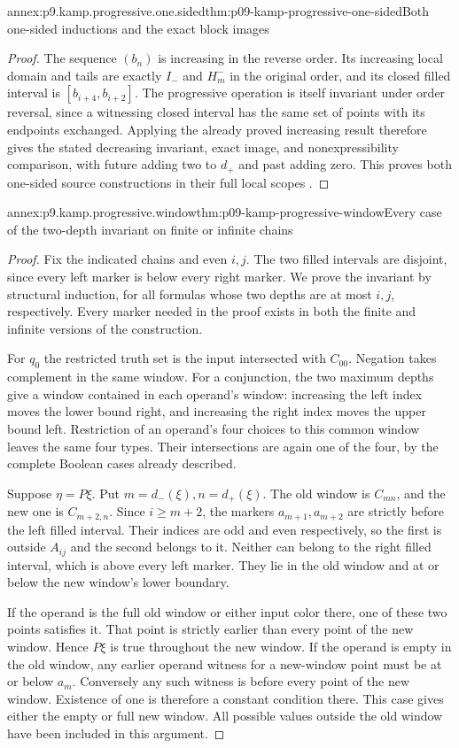 \begin{annexitem}{annex:p9.kamp.progressive.one.sided}{thm:p09-kamp-progressive-one-sided}{Both one-sided inductions and the exact block images}
\begin{proof}
The sequence \((b_n)\) is increasing
in the reverse order. Its increasing
local domain and tails are exactly
\(I_-\) and \(H_m^-\) in the original
order, and its closed filled interval is
\([b_{i+4},b_{i+2}]\). The progressive
operation is itself invariant under order
reversal, since a witnessing closed interval
has the same set of points with its
endpoints exchanged. Applying the already
proved increasing result therefore gives
the stated decreasing invariant, exact
image, and nonexpressibility comparison,
with future adding two to \(d_+\) and
past adding zero. This proves both one-sided
source constructions in their full local
scopes
\cite[pp.~114--116]{Kamp1968}.
\end{proof}
\end{annexitem}

\begin{annexitem}{annex:p9.kamp.progressive.window}{thm:p09-kamp-progressive-window}{Every case of the two-depth invariant on finite or infinite chains}
\begin{proof}
Fix the indicated chains and even \(i,j\).
The two filled intervals are disjoint, since
every left marker is below every right marker.
We prove the invariant by structural induction,
for all formulas whose two depths are at most
\(i,j\), respectively. Every marker needed
in the proof exists in both the finite and
infinite versions of the construction.

For \(q_0\) the restricted truth set is
the input intersected with \(C_{00}\).
Negation takes complement in the same
window. For a conjunction, the two
maximum depths give a window contained
in each operand's window: increasing
the left index moves the lower bound
right, and increasing the right index
moves the upper bound left. Restriction
of an operand's four choices to this
common window leaves the same four
types. Their intersections are again
one of the four, by the complete
Boolean cases already described.

Suppose \(\eta=P\xi\). Put
\(m=d_-(\xi),n=d_+(\xi)\).
The old window is \(C_{mn}\), and
the new one is \(C_{m+2,n}\).
Since \(i\geq m+2\), the markers
\(a_{m+1},a_{m+2}\) are strictly
before the left filled interval. Their
indices are odd and even respectively,
so the first is outside \(A_{ij}\)
and the second belongs to it. Neither
can belong to the right filled interval,
which is above every left marker.
They lie in the old window and at or
below the new window's lower boundary.

If the operand is the full old window
or either input color there, one of
these two points satisfies it. That
point is strictly earlier than every
point of the new window. Hence
\(P\xi\) is true throughout the
new window. If the operand is empty
in the old window, any earlier
operand witness for a new-window
point must be at or below \(a_m\).
Conversely any such witness is before
every point of the new window.
Existence of one is therefore a
constant condition there. This case
gives either the empty or full new
window. All possible values outside
the old window have been included
in this argument.


\end{proof}
\end{annexitem}
